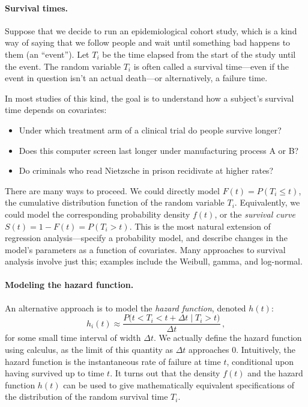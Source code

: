 \documentclass[11pt]{article}
\newcommand{\1}[1]{\mathbf{1}_{\{ {#1} \}}}
\begin{document}
\paragraph{Survival times.} Suppose that we decide to run an epidemiological cohort study, which is a kind way of saying that we follow people and wait until something bad happens to them (an ``event'').  Let $T_i$ be the time elapsed from the start of the study until the event.  The random variable $T_i$ is often called a survival time---even if the event in question isn't an actual death---or alternatively, a failure time.

In most studies of this kind, the goal is to understand how a subject's survival time depends on covariates:
\begin{itemize}
\item Under which treatment arm of a clinical trial do people survive longer?
\item Does this computer screen last longer under manufacturing process A or B?
\item Do criminals who read Nietzsche in prison recidivate at higher rates?
\end{itemize}

There are many ways to proceed.  We could directly model $F(t) = P(T_i \leq t)$, the cumulative distribution function of the random variable $T_i$.  Equivalently, we could model the corresponding probability density $f(t)$, or the \textit{survival curve} $S(t) = 1 - F(t) = P(T_i > t)$.  This is the most natural extension of regression analysis---specify a probability model, and describe changes in the model's parameters as a function of covariates.  Many approaches to survival analysis involve just this; examples include the Weibull, gamma, and log-normal.

\paragraph{Modeling the hazard function.}

An alternative approach is to model the \textit{hazard function}, denoted $h(t)$:
$$
h_i(t) \approx \frac{P \big(t < T_i < t + \Delta t \mid  T_i > t \big) }{\Delta t}  \, ,
$$
for some small time interval of width $\Delta t$.  We actually define the hazard function using calculus, as the limit of this quantity as $\Delta t$ approaches 0.  Intuitively, the hazard function is the instantaneous rate of failure at time $t$, conditional upon having survived up to time $t$.  It turns out that the density $f(t)$ and the hazard function $h(t)$ can be used to give mathematically equivalent specifications of the distribution of the random survival time $T_i$.
\end{document}
